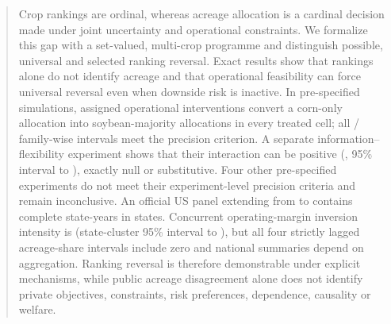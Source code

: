 \begin{abstract}
Crop rankings are ordinal, whereas acreage allocation is a cardinal decision made under joint uncertainty and operational constraints. We formalize this gap with a set-valued, multi-crop programme and distinguish possible, universal and selected ranking reversal. Exact results show that rankings alone do not identify acreage and that operational feasibility can force universal reversal even when downside risk is inactive. In pre-specified simulations, assigned operational interventions convert a corn-only allocation into soybean-majority allocations in every treated cell; all \EtwoPassedIntervals{}/\EtwoIntervals{} family-wise intervals meet the precision criterion. A separate information--flexibility experiment shows that their interaction can be positive (\EsixPositive{}, 95\% interval \EsixPositiveLow{} to \EsixPositiveHigh{}), exactly null or substitutive. Four other pre-specified experiments do not meet their experiment-level precision criteria and remain inconclusive. An official US panel extending from \EmpiricalStartYear{} to \EmpiricalEndYear{} contains \NStateYears{} complete state-years in \NStates{} states. Concurrent operating-margin inversion intensity is \OperatingInversion{} (state-cluster 95\% interval \OperatingInversionLow{} to \OperatingInversionHigh{}), but all four strictly lagged acreage-share intervals include zero and national summaries depend on aggregation. Ranking reversal is therefore demonstrable under explicit mechanisms, while public acreage disagreement alone does not identify private objectives, constraints, risk preferences, dependence, causality or welfare.
\end{abstract}
